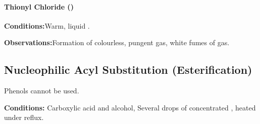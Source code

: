 

			\paragraph{Thionyl Chloride ()}

			\vspace{1.5em}
			\vbox{\textbf{Conditions:}\tabto{35mm}Warm, liquid .}

			\vspace{0.75em}
			\vbox{\textbf{Observations:}\tabto{35mm}Formation of colourless, pungent  gas,
										\tabto{35mm}white fumes of  gas.}






		\pagebreak
		\subsection{Nucleophilic Acyl Substitution (Esterification)}

			Phenols cannot be used.

			\vspace{1.5em}
			\vbox{\textbf{Conditions:}	\tabto{35mm}Carboxylic acid and alcohol,
										\tabto{35mm}Several drops of concentrated , heated under reflux.}

